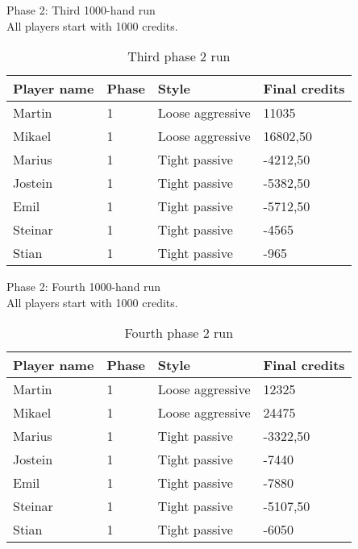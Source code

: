 \documentclass[a4paper, 12pt]{article}
\begin{document}
\begin{center}
	{ \Large Phase 2: Third 1000-hand run } \\
	All players start with 1000 credits.
\end{center}

\begin{table}[H]
	\begin{center}
		\begin{tabular}{|l|l|l| p{6cm} |}
		\hline
		\textbf{Player name} & \textbf{Phase} & \textbf{Style} & \textbf{Final credits} \\
		\hline
		Martin & 1 & Loose aggressive & 11035 \\
		\hline
		Mikael & 1 & Loose aggressive & 16802,50 \\
		\hline
		Marius & 1 & Tight passive & -4212,50 \\
		\hline
		Jostein & 1 & Tight passive & -5382,50 \\
		\hline
		Emil & 1 & Tight passive & -5712,50 \\
		\hline
		Steinar & 1 & Tight passive & -4565 \\
		\hline
		Stian & 1 & Tight passive & -965 \\
		\hline
		\end{tabular}
	\end{center}
	\caption{Third phase 2 run}
\end{table}

\begin{center}
	{ \Large Phase 2: Fourth 1000-hand run } \\
	All players start with 1000 credits.
\end{center}

\begin{table}[H]
	\begin{center}
		\begin{tabular}{|l|l|l| p{6cm} |}
		\hline
		\textbf{Player name} & \textbf{Phase} & \textbf{Style} & \textbf{Final credits} \\
		\hline
		Martin & 1 & Loose aggressive & 12325 \\
		\hline
		Mikael & 1 & Loose aggressive & 24475 \\
		\hline
		Marius & 1 & Tight passive & -3322,50 \\
		\hline
		Jostein & 1 & Tight passive & -7440 \\
		\hline
		Emil & 1 & Tight passive & -7880 \\
		\hline
		Steinar & 1 & Tight passive & -5107,50 \\
		\hline
		Stian & 1 & Tight passive & -6050 \\
		\hline
		\end{tabular}
	\end{center}
	\caption{Fourth phase 2 run}
\end{table}
\end{document}
